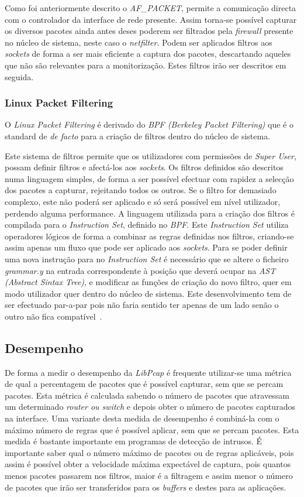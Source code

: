 Como foi anteriormente descrito o \textit{AF\_PACKET}, permite a comunicação directa com o controlador da interface de rede presente.
 Assim torna-se possível capturar os diversos pacotes ainda antes deses poderem ser filtrados pela \textit{firewall} presente no núcleo de sistema, neste caso o \textit{netfilter}.
Podem ser aplicados filtros aos \textit{sockets} de forma a ser mais eficiente a captura dos pacotes, descartando aqueles que não são relevantes para a monitorização. 
 Estes filtros irão ser descritos em seguida.


\subsubsection{Linux Packet Filtering}
O \textit{Linux Packet Filtering} é derivado do \textit{BPF (Berkeley Packet Filtering)} que é o standard de \textit{de facto} para a criação de filtros dentro do núcleo de sistema. 

Este sistema de filtros permite que os utilizadores com permissões de \textit{Super User}, possam definir filtros e afectá-los aos \textit{sockets}. Os filtros definidos são descritos numa linguagem simples, de forma a ser possível efectuar com rapidez a selecção dos pacotes a capturar, rejeitando todos os outros. Se o filtro for demasiado complexo, este não poderá ser aplicado e só será possível em nível utilizador, perdendo alguma performance. A linguagem utilizada para a criação dos filtros é compilada para o \textit{Instruction Set}, definido no \textit{BPF}. Este \textit{Instruction Set} utiliza operadores lógicos de forma a combinar as regras definidas nos filtros, criando-se assim apenas um fluxo que pode ser aplicado aos \textit{sockets}.
Para se poder definir uma nova instrução para no \textit{Instruction Set} é necessário que se altere o ficheiro \textit{grammar.y} na entrada correspondente à posição que deverá ocupar na \textit{AST (Abstract Sintax Tree)}, e modificar as funções de criação do novo filtro, quer em modo utilizador quer dentro do núcleo de sistema. Este desenvolvimento tem de ser efectuado par-a-par pois não faria sentido ter apenas de um lado senão o outro não fica compatível~\cite{Mccanne92thebsd}.

\subsection{Desempenho}
De forma a medir o desempenho da \textit{LibPcap} é frequente utilizar-se uma métrica de qual a percentagem de pacotes que é possível capturar, sem que se percam pacotes. Esta métrica é calculada sabendo o número de pacotes que atravessam um determinado \textit{router ou switch} e depois obter o número de pacotes capturados na interface. Uma variante desta medida de desempenho é combiná-la com o máximo número de regras que é possível aplicar, sem que se percam pacotes. Esta medida é bastante importante em programas de detecção de intrusos. É importante saber qual o número máximo de pacotes ou de regras aplicáveis, pois assim é possível obter a velocidade máxima expectável de captura, pois quantos menos pacotes passarem nos filtros, maior é a filtragem e assim menor o número de pacotes que irão ser transferidos para os \textit{buffers} e destes para as aplicações.

